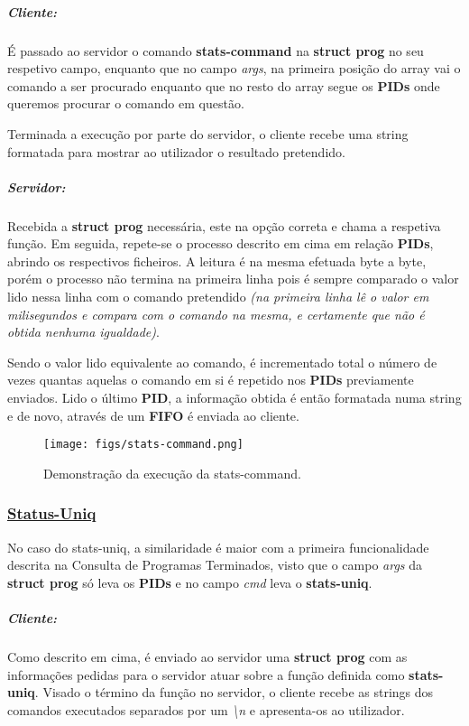 \documentclass{report}
\begin{document}
\subparagraph{Cliente:}
É passado ao servidor o comando \textbf{stats-command} na \textbf{struct prog} no seu respetivo campo, enquanto que no campo \textit{args}, na primeira posição do array vai o comando a ser procurado enquanto que no resto do array segue os \textbf{PIDs} onde queremos procurar o comando em questão.\par
Terminada a execução por parte do servidor, o cliente recebe uma string formatada para mostrar ao utilizador o resultado pretendido.

\subparagraph{Servidor:}
Recebida a \textbf{struct prog} necessária, este na opção correta e chama a respetiva função. Em seguida, repete-se o processo descrito em cima em relação \textbf{PIDs}, abrindo os respectivos ficheiros. A leitura é na mesma efetuada byte a byte, porém o processo não termina na primeira linha pois é sempre comparado o valor lido nessa linha com o comando pretendido \textit{(na primeira linha lê o valor em milisegundos e compara com o comando na mesma, e certamente que não é obtida nenhuma igualdade)}.\par
Sendo o valor lido equivalente ao comando, é incrementado total o número de vezes quantas aquelas o comando em si é repetido nos \textbf{PIDs} previamente enviados.
Lido o último \textbf{PID}, a informação obtida é então formatada numa string e de novo, através de um \textbf{FIFO} é enviada ao cliente.\\

\begin{figure}[h]
    \centering
    \texttt{[image: figs/stats-command.png]}
    \caption{Demonstração da execução da stats-command.}
    \label{f}
\end{figure}

\newpage
\subsubsection{\underline{Status-Uniq}}
No caso do stats-uniq, a similaridade é maior com a primeira funcionalidade descrita na Consulta de Programas Terminados, visto que o campo \textit{args} da \textbf{struct prog} só leva os \textbf{PIDs} e no campo \textit{cmd} leva o \textbf{stats-uniq}.

\subparagraph{Cliente:} Como descrito em cima, é enviado ao servidor uma \textbf{struct prog} com as informações pedidas para o servidor atuar sobre a função definida como \textbf{stats-uniq}.
Visado o término da função no servidor, o cliente recebe as strings dos comandos executados separados por um \textit{\textbackslash n} e apresenta-os ao utilizador.
\end{document}
